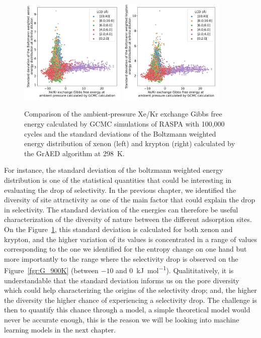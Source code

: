 \documentclass[main]{subfiles}
\begin{document}
\begin{figure}[ht]
  \centering
    \includegraphics[width=0.45\textwidth]{figures/3-fastsim/G_2080_vs_enthalpy_std_x_overview.jpg}
    \includegraphics[width=0.45\textwidth]{figures/3-fastsim/G_2080_vs_enthalpy_std_y_overview.jpg}
        \caption{Comparison of the ambient-pressure Xe/Kr exchange Gibbs free energy calculated by GCMC simulations of RASPA with 100,000 cycles and the standard deviations of the Boltzmann weighted energy distribution of xenon (left) and krypton (right) calculated by the GrAED algorithm at \SI{298}{\kelvin}.}\label{fgr:enthalpy_std}\label{fgr:enthalpy_std}
\end{figure}

For instance, the standard deviation of the boltzmann weighted energy distribution is one of the statistical quantities that could be interesting in evaluating the drop of selectivity. In the previous chapter, we identified the diversity of site attractivity as one of the main factor that could explain the drop in selectivity. The standard deviation of the energies can therefore be useful characterization of the diversity of nature between the different adsorption sites. On the Figure~\ref{fgr:enthalpy_std}, this standard deviation is calculated for both xenon and krypton, and the higher variation of its values is concentrated in a range of values corresponding to the one we identified for the entropy change on one hand but more importantly to the range where the selectivity drop is observed on the Figure~\ref{fgr:G_900K} (between $-10$ and $0$~\si{\kilo\joule\per\mole}). Qualititatively, it is understandable that the standard deviation informs us on the pore diversity which could help characterizing the origins of the selectivity drop; and, the higher the diversity the higher chance of experiencing a selectivity drop. The challenge is then to quantify this chance through a model, a simple theoretical model would never be accurate enough, this is the reason we will be looking into machine learning models in the next chapter.
\end{document}
